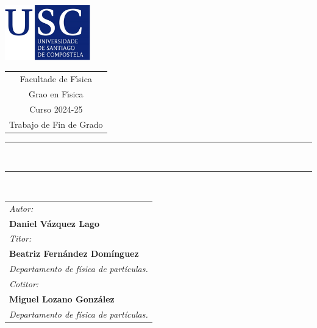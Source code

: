 \begin{center}
\vspace{3em}
\includegraphics[width=10em]{USC.png}
\hspace{1cm}
\begin{tabular}[b]{c}
{\large\color{usc}  Facultade de F\'{\i}sica} \vspace{0.5em}\\
{\large\color{usc}  Grao en F\'{\i}sica } \vspace{0.5em}\\  %
{\large\color{usc}  Curso 2024-25} \vspace{0.5em}\\%
{\Large\color{usc}  Trabajo de Fin de Grado} %
\end{tabular}



\vspace{3cm}
\rule{65mm}{0.2mm}\\
\vspace{1cm}

{\LARGE \TituloDoTraballo}




\vspace{0.5cm}
\rule{65mm}{0.2mm}\\
\vspace{2cm}
\end{center}


\begin{tabular}{l}
{\sl\large Autor:} \\
{\bf\Large Daniel Vázquez Lago} %
\vspace{1em}\mbox{} \\
%
{\sl\large Titor:} \\
{\bf\large Beatriz Fernández Domínguez} \\
{\sl\large Departamento de física de partículas.}
\vspace{1em}\mbox{} \\
%
{\sl\large Cotitor: } \\
{\bf\large Miguel Lozano González} \\
{\sl\large Departamento de física de partículas.}
\end{tabular}



